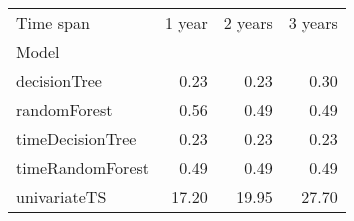 \begin{tabular}{lrrr}
\toprule
Time span & 1 year & 2 years & 3 years \\
Model &  &  &  \\
\midrule
decisionTree & 0.23 & 0.23 & 0.30 \\
randomForest & 0.56 & 0.49 & 0.49 \\
timeDecisionTree & 0.23 & 0.23 & 0.23 \\
timeRandomForest & 0.49 & 0.49 & 0.49 \\
univariateTS & 17.20 & 19.95 & 27.70 \\
\bottomrule
\end{tabular}
